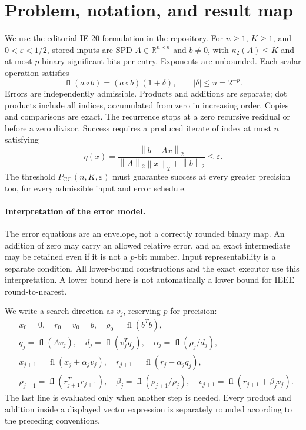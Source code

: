 \documentclass[11pt]{article}
\theoremstyle{remark}\newtheorem{remark}[theorem]{Remark}
\newcommand{\R}{\mathbb R}
\newcommand{\norm}[1]{\left\lVert#1\right\rVert_2}
\newcommand{\fl}{\operatorname{fl}}
\newcommand{\PCG}{P_{\mathrm{CG}}}
\newcommand{\eps}{\varepsilon}
\begin{document}
\section{Problem, notation, and result map}
\label{sec:problem}

We use the editorial IE-20 formulation in the repository\cite{ie20}.
For $n\ge1$, $K\ge1$, and $0<\eps<1/2$, stored inputs are SPD
$A\in\R^{n\times n}$ and $b\ne0$, with $\kappa_2(A)\le K$ and at most
$p$ binary significant bits per entry. Exponents are unbounded. Each
scalar operation satisfies
\[
\fl(a\circ b)=(a\circ b)(1+\delta),\qquad |\delta|\le u=2^{-p}.
\]
Errors are independently admissible. Products and additions are separate;
dot products include all indices, accumulated from zero in increasing
order. Copies and comparisons are exact. The recurrence stops at a zero
recursive residual or before a zero divisor. Success requires a produced
iterate of index at most $n$ satisfying
\begin{equation}\label{eq:eta}
\eta(x)=\frac{\norm{b-Ax}}{\norm A\norm x+\norm b}\le\eps.
\end{equation}
The threshold $\PCG(n,K,\eps)$ must guarantee success at every greater
precision too, for every admissible input and error schedule.

\paragraph{Interpretation of the error model.}
The error equations are an envelope, not a correctly rounded binary map.
An addition of zero may carry an allowed relative error, and an exact
intermediate may be retained even if it is not a $p$-bit number. Input
representability is a separate condition. All lower-bound constructions
and the exact executor use this interpretation. A lower bound here is
not automatically a lower bound for IEEE round-to-nearest.

We write a search direction as $v_j$, reserving $p$ for precision:
\begin{align*}
&x_0=0,\quad r_0=v_0=b,\quad \rho_0=\fl(b^Tb),\\
&q_j=\fl(Av_j),\quad d_j=\fl(v_j^Tq_j),\quad
\alpha_j=\fl(\rho_j/d_j),\\
&x_{j+1}=\fl(x_j+\alpha_jv_j),\quad
r_{j+1}=\fl(r_j-\alpha_jq_j),\\
&\rho_{j+1}=\fl(r_{j+1}^Tr_{j+1}),\quad
\beta_j=\fl(\rho_{j+1}/\rho_j),\quad
v_{j+1}=\fl(r_{j+1}+\beta_jv_j).
\end{align*}
The last line is evaluated only when another step is needed. Every
product and addition inside a displayed vector expression is separately
rounded according to the preceding conventions.
\end{document}
